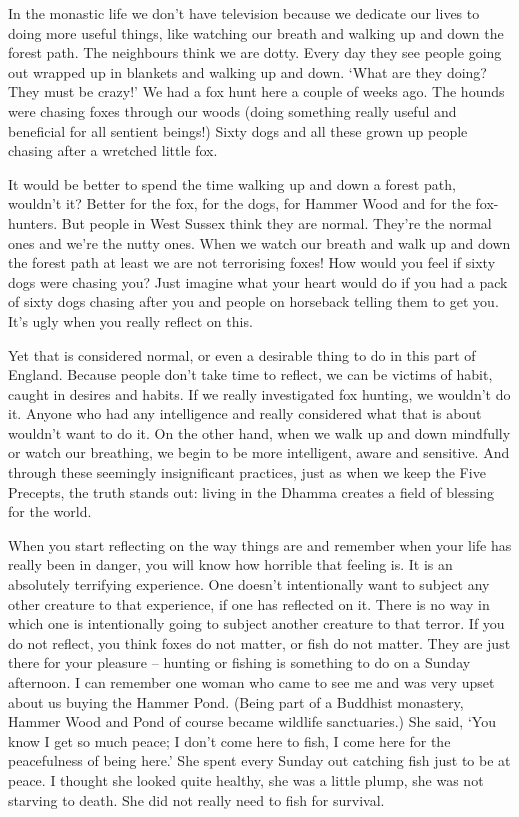 In the monastic life we don't have television because we dedicate our lives to doing more useful things, like watching our breath and walking up and down the forest path. The neighbours think we are dotty. Every day they see people going out wrapped up in blankets and walking up and down. `What are they doing? They must be crazy!' We had a fox hunt here a couple of weeks ago. The hounds were chasing foxes through our woods (doing something really useful and beneficial for all sentient beings!) Sixty dogs and all these grown up people chasing after a wretched little fox.

It would be better to spend the time walking up and down a forest path, wouldn't it? Better for the fox, for the dogs, for Hammer Wood and for the fox-hunters. But people in West Sussex think they are normal. They're the normal ones and we're the nutty ones. When we watch our breath and walk up and down the forest path at least we are not terrorising foxes! How would you feel if sixty dogs were chasing you? Just imagine what your heart would do if you had a pack of sixty dogs chasing after you and people on horseback telling them to get you. It's ugly when you really reflect on this.

Yet that is considered normal, or even a desirable thing to do in this part of England. Because people don't take time to reflect, we can be victims of habit, caught in desires and habits. If we really investigated fox hunting, we wouldn't do it. Anyone who had any intelligence and really considered what that is about wouldn't want to do it. On the other hand, when we walk up and down mindfully or watch our breathing, we begin to be more intelligent, aware and sensitive. And through these seemingly insignificant practices, just as when we keep the Five Precepts, the truth stands out: living in the Dhamma creates a field of blessing for the world.

When you start reflecting on the way things are and remember when your life has really been in danger, you will know how horrible that feeling is. It is an absolutely terrifying experience. One doesn't intentionally want to subject any other creature to that experience, if one has reflected on it. There is no way in which one is intentionally going to subject another creature to that terror. If you do not reflect, you think foxes do not matter, or fish do not matter. They are just there for your pleasure -- hunting or fishing is something to do on a Sunday afternoon. I can remember one woman who came to see me and was very upset about us buying the Hammer Pond. (Being part of a Buddhist monastery, Hammer Wood and Pond of course became wildlife sanctuaries.) She said, `You know I get so much peace; I don't come here to fish, I come here for the peacefulness of being here.' She spent every Sunday out catching fish just to be at peace. I thought she looked quite healthy, she was a little plump, she was not starving to death. She did not really need to fish for survival.

